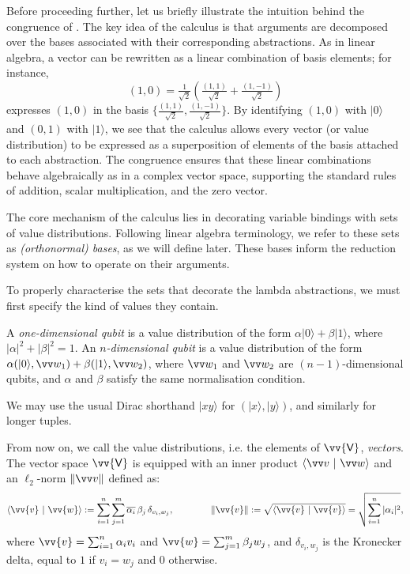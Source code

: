 \documentclass[runningheads,orivec,envcountsame,envcountsect]{llncs}
\newcommand\ket[1]{\ensuremath{|#1\rangle}}
\DeclareRobustCommand{\ValD}{\ensuremath{\vv{\mathsf{V}}}}
\def\scal#1#2{\langle{#1}~|~{#2}\rangle}
\def\Pair#1#2{(#1,#2)} %
\begin{document}
Before proceeding further, let us briefly illustrate the intuition behind
the congruence of .
The key idea of the calculus is that arguments are decomposed over the bases
associated with their corresponding abstractions.
As in linear algebra, a vector can be rewritten as a linear combination of
basis elements; for instance,
\[
  (1,0)
  = \tfrac{1}{\sqrt{2}}\!\left(\tfrac{(1,1)}{\sqrt{2}}
  + \tfrac{(1,-1)}{\sqrt{2}}\right)
\]
expresses $(1,0)$ in the basis
$\{\tfrac{(1,1)}{\sqrt{2}}, \tfrac{(1,-1)}{\sqrt{2}}\}$.
By identifying $(1,0)$ with $\ket{0}$ and $(0,1)$ with $\ket{1}$, we see
that the calculus allows every vector (or value distribution)
to be expressed as a superposition of elements of the basis attached to
each abstraction.
The congruence ensures that these linear combinations behave
algebraically as in a complex vector space, supporting the standard
rules of addition, scalar multiplication, and the zero vector.



The core mechanism of the calculus lies in decorating variable bindings with
sets of value distributions. Following linear algebra terminology, we refer to
these sets as \emph{(orthonormal) bases}, as we will define later. These bases
inform the reduction system on how to operate on their arguments.

To properly characterise the sets that decorate the lambda abstractions, we
must first specify the kind of values they contain.
\begin{definition}[Qubits]\label{def:Qubit}
  A \emph{one-dimensional qubit} is a value distribution of the form
  $\alpha\ket{0} + \beta\ket{1}$, where $|\alpha|^2 + |\beta|^2 = 1$. An
  \emph{$n$-dimensional qubit} is a value distribution of the form
  $\alpha\Pair{\ket{0}}{\vv w_1} + \beta\Pair{\ket{1}}{\vv w_2}$, where
  $\vv w_1$ and $\vv w_2$ are $(n-1)$-dimensional qubits, and $\alpha$ and
  $\beta$ satisfy the same normalisation condition.
\end{definition}
We may use the usual Dirac shorthand $\ket{xy}$ for $(\ket{x},\ket{y})$, and
similarly for longer tuples.

From now on, we call the value distributions, i.e. the elements of $\ValD$,
\emph{vectors}. The vector space $\ValD$ is equipped with an inner
product $\scal{\vv v}{\vv w}$ and an $\ell_2$-norm $\|\vv v\|$ defined as:
\[
  \scal{\vv{v}}{\vv{w}} := \sum_{i=1}^n\sum_{j=1}^m
  \overline{\alpha_i}\,\beta_j\,\delta_{v_i,w_j},
  \qquad\qquad
  \|\vv{v}\| := \sqrt{\scal{\vv{v}}{\vv{v}}}
  = \sqrt{\sum_{i=1}^n|\alpha_i|^2},
\]
where $\vv{v}=\sum_{i=1}^n\alpha_i v_i$ and
$\vv{w}=\sum_{j=1}^m\beta_j w_j$, and $\delta_{v_i,w_j}$ is the Kronecker
delta, equal to $1$ if $v_i=w_j$ and $0$ otherwise.
\end{document}
